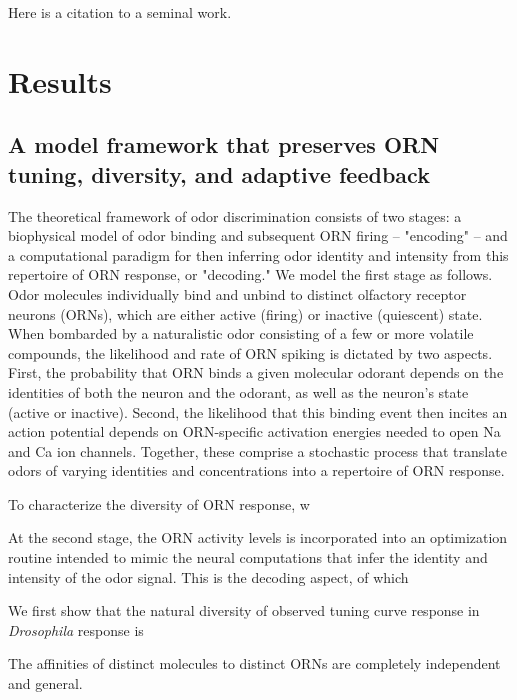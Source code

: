 
Here is a citation to a seminal work\cite{OKeeNade78a}. \lipsum[2-3]

\section*{Results}

\subsection*{A model framework that preserves ORN tuning, diversity, and adaptive feedback}

The theoretical framework of odor discrimination consists of two stages: a biophysical model of odor binding and subsequent ORN firing -- "encoding" -- and a computational paradigm for then inferring odor identity and intensity from this repertoire of ORN response, or "decoding." We model the first stage as follows. Odor molecules individually bind and unbind to distinct olfactory receptor neurons (ORNs), which are either active (firing) or inactive (quiescent) state. When bombarded by a naturalistic odor consisting of a few or more volatile compounds, the likelihood and rate of ORN spiking is dictated by two aspects. First, the probability that ORN binds a given molecular odorant depends on the identities of both the neuron and the odorant, as well as the neuron's state (active or inactive). Second, the likelihood that this binding event then incites an action potential depends on ORN-specific activation energies needed to open Na and Ca ion channels. Together, these comprise a stochastic process that translate odors of varying identities and concentrations into a repertoire of ORN response.

To characterize the diversity of ORN response, w

At the second stage, the ORN activity levels is incorporated into an optimization routine intended to mimic the neural computations that infer the identity and intensity of the odor signal. This is the decoding aspect, of which 



We first show that the natural diversity of observed tuning curve response in \textit{Drosophila} response is 




The affinities of distinct molecules to distinct ORNs are completely independent and general. 

\subsection*{}



